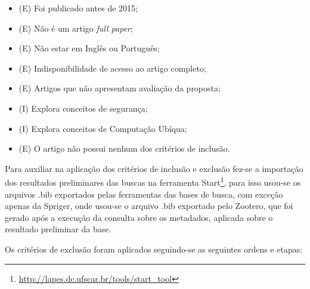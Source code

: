 \documentclass[ti,table]{texufpel} %
\begin{document}
\begin{itemize} 

    \item (E) Foi publicado antes de 2015; 

    \item (E) Não é um artigo \textit{full paper}; 

    \item (E) Não estar em Inglês ou Português; 

    \item (E) Indisponibilidade de acesso ao artigo completo; 

    \item (E) Artigos que não apresentam avaliação da proposta; 

    \item (I) Explora conceitos de segurança; 

    \item (I) Explora conceitos de Computação Ubíqua; 

    \item (E) O artigo não possui nenhum dos critérios de inclusão. 

\end{itemize} 

  

Para auxiliar na aplicação dos critérios de inclusão e exclusão fez-se a importação dos resultados preliminares das buscas na ferramenta Start\footnote{\url{http://lapes.dc.ufscar.br/tools/start_tool}}, para isso usou-se os arquivos .bib exportados pelas ferramentas das bases de busca, com exceção apenas da Spriger, onde usou-se o arquivo .bib exportado pelo Zootero, que foi gerado após a execução da consulta sobre os metadados, aplicada sobre o resultado preliminar da base. 

  

Os critérios de exclusão foram aplicados seguindo-se as seguintes ordens e etapas: 

  

  

  

  
\end{document}
